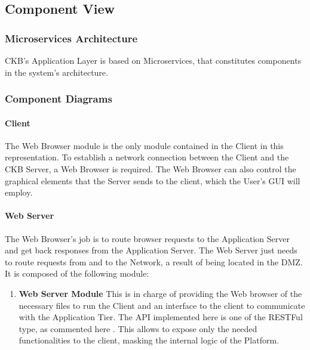 \subsection{Component View}
\subsubsection{Microservices Architecture}
CKB's Application Layer is based on Microservices, that constitutes components in the system's architecture.
\newpage
\subsubsection{Component Diagrams}
\newpage

\paragraph{Client}
The Web Browser module is the only module contained in the Client in this representation.
To establish a network connection between the Client and the CKB Server, a Web Browser is required. The Web Browser can also control the graphical elements that the Server sends to the client, which the User's GUI will employ.

\paragraph{Web Server}
The Web Browser's job is to route browser requests to the Application Server and get back responses from the Application Server. The Web Server just needs to route requests from and to the Network, a result of being located in the DMZ. It is composed of the following module:
\begin{enumerate}[label=$\bullet$]
    \item \textbf{Web Server Module} This is in charge of providing the Web browser of the necessary files to run the Client and an interface to the client to communicate with the Application Tier.  
    The API implemented here is one of the RESTFul type, as commented here .
    This allows to expose only the needed functionalities to the client, masking the internal logic of the Platform.
\end{enumerate}
\newpage

